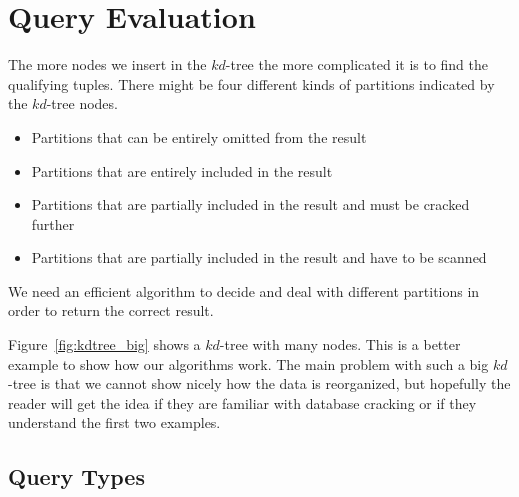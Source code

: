\section{Query Evaluation}
\label{sec:result_generation}


The more nodes we insert in the $kd$-tree the more complicated it is to find the qualifying tuples.
There might be four different kinds of partitions indicated by the $kd$-tree nodes.
\begin{itemize}
\item Partitions that can be entirely omitted from the result
\item Partitions that are entirely included in the result
\item Partitions that are partially included in the result and must be cracked further
\item Partitions that are partially included in the result and have to be scanned
\end{itemize}
We need an efficient algorithm to decide and deal with different partitions in order to return the correct result.

Figure~\ref{fig:kdtree_big} shows a $kd$-tree with many nodes.
This is a better example to show how our algorithms work.
The main problem with such a big $kd$-tree is that we cannot show nicely how the data is reorganized, but hopefully the reader will get the idea if they are familiar with database cracking or if they understand the first two examples.



\subsection{Query Types}
\label{subsec:queries}



